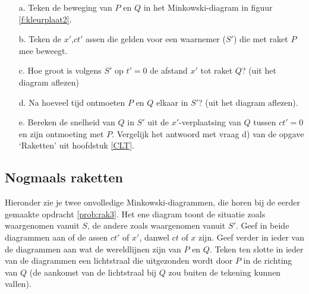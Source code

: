 \begin{itemize}
\item [a.]
Teken de beweging van $P$ en $Q$ in het Minkowski-diagram in figuur \ref{f:kleurplaat2}. 
 
\item [b.]
  Teken de $x'$,$ct'$ assen die gelden voor een waarnemer ($S'$) die met 
raket $P$ mee beweegt. 
\item [c.]
  Hoe groot is volgens $S'$ op $t' = 0$ de afstand $x'$ tot raket $Q$? 
(uit het diagram aflezen) 
\item [d.]
  Na hoeveel tijd ontmoeten $P$ en $Q$ elkaar in $S'$? (uit het diagram
  aflezen).
\item [e.]
Bereken  de  snelheid  van  $Q$  in  $S'$  uit  de $x'$-verplaatsing van $Q$
tussen $ct' = 0$ en zijn ontmoeting met $P$. 
Vergelijk het antwoord met vraag d) van de opgave `Raketten' uit hoofdstuk \ref{CLT}.
\end{itemize}

%
%

\subsection{Nogmaals raketten}

			Hieronder zie je twee onvolledige Minkowski-diagrammen, die horen bij de eerder gemaakte opdracht \ref{prob:rak3}. Het ene diagram
toont de situatie zoals waargenomen vanuit $S$, de andere zoals waargenomen
vanuit $S'$. Geef in beide diagrammen aan of de assen $ct'$ of $x'$, danwel $ct$ of $x$ zijn. Geef verder in
ieder van de diagrammen aan wat de wereldlijnen zijn van $P$ en $Q$. Teken ten
 slotte in ieder van de diagrammen een lichtstraal die uitgezonden wordt
door $P$ in de richting van $Q$ (de aankomst van de lichtstraal bij $Q$ zou
buiten de tekening kunnen vallen).
			
			

